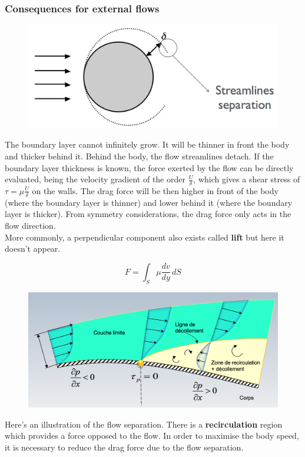 \subsubsection{Consequences for external flows}
\begin{figure}
	\vspace{-5mm}
	\includegraphics[scale=0.25]{ch1/14}
\end{figure}	
The boundary layer cannot infinitely grow. It will be thinner in front the body and thicker behind it. Behind the body, the flow streamlines detach. If the boundary layer thickness is known, the force exerted by the flow can be directly evaluated, being the velocity gradient of the order $\frac{U}{\delta}$, which gives a shear stress of $\tau = \mu\frac{U}{\delta}$ on the walls. The drag force will be then higher in front of the body (where the boundary layer is thinner) and lower behind it (where the boundary layer is thicker). From symmetry considerations, the drag force only acts in the flow direction. \\
More commonly, a perpendicular component also exists called \textbf{lift} but here it doesn't appear. 
	
\begin{equation}
	F = \int _S \mu \frac{dv}{dy} \, dS
\end{equation}
	
\begin{figure}
	\vspace{-5mm}
	\includegraphics[scale=0.25]{ch1/15}
\end{figure}
Here's an illustration of the flow separation. There is a \textbf{recirculation} region which provides a force opposed to the flow. In order to maximise the body speed, it is necessary to reduce the drag force due to the flow separation.  